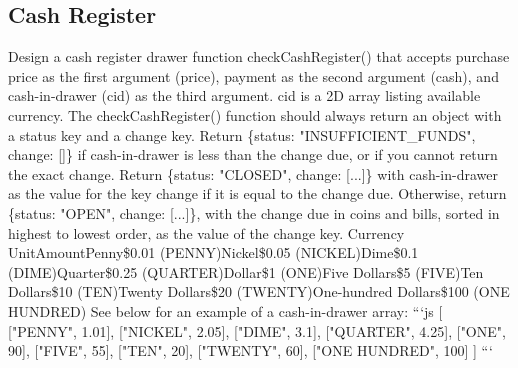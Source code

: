 \documentclass{article}%
\begin{document}
\subsection{Cash Register}%
\label{subsec:CashRegister}%
Design a cash register drawer function checkCashRegister() that accepts purchase price as the first argument (price), payment as the second argument (cash), and cash{-}in{-}drawer (cid) as the third argument.\newline%
cid is a 2D array listing available currency.\newline%
The checkCashRegister() function should always return an object with a status key and a change key.\newline%
Return \{status: "INSUFFICIENT\_FUNDS", change: {[}{]}\} if cash{-}in{-}drawer is less than the change due, or if you cannot return the exact change.\newline%
Return \{status: "CLOSED", change: {[}...{]}\} with cash{-}in{-}drawer as the value for the key change if it is equal to the change due.\newline%
Otherwise, return \{status: "OPEN", change: {[}...{]}\}, with the change due in coins and bills, sorted in highest to lowest order, as the value of the change key.\newline%
Currency UnitAmountPenny\$0.01 (PENNY)Nickel\$0.05 (NICKEL)Dime\$0.1 (DIME)Quarter\$0.25 (QUARTER)Dollar\$1 (ONE)Five Dollars\$5 (FIVE)Ten Dollars\$10 (TEN)Twenty Dollars\$20 (TWENTY)One{-}hundred Dollars\$100 (ONE HUNDRED)\newline%
See below for an example of a cash{-}in{-}drawer array:\newline%
```js\newline%
{[}\newline%
  {[}"PENNY", 1.01{]},\newline%
  {[}"NICKEL", 2.05{]},\newline%
  {[}"DIME", 3.1{]},\newline%
  {[}"QUARTER", 4.25{]},\newline%
  {[}"ONE", 90{]},\newline%
  {[}"FIVE", 55{]},\newline%
  {[}"TEN", 20{]},\newline%
  {[}"TWENTY", 60{]},\newline%
  {[}"ONE HUNDRED", 100{]}\newline%
{]}\newline%
```\newline%

%
\newpage%
\end{document}
